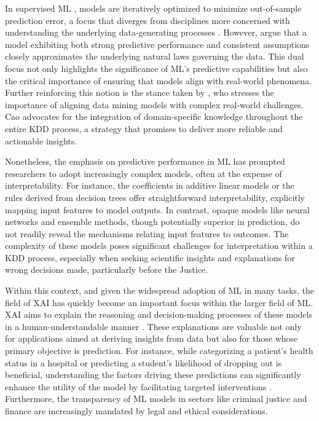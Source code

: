 In supervised ML \cite{Vapnik1999AnTheory}, models are iteratively optimized to minimize out-of-sample prediction error, a focus that diverges from disciplines more concerned with understanding the underlying data-generating processes \cite{Mullainathan2017MachineApproach}. However, \cite{Shmueli2010ToPredict, Zhao2021CausalModels} argue that a model exhibiting both strong predictive performance and consistent assumptions closely approximates the underlying natural laws governing the data. This dual focus not only highlights the significance of ML's predictive capabilities but also the critical importance of ensuring that models align with real-world phenomena. Further reinforcing this notion is the stance taken by \cite{Cao2009IntroductionMining}, who stresses the importance of aligning data mining models with complex real-world challenges. Cao advocates for the integration of domain-specific knowledge throughout the entire \gls{KDD} process, a strategy that promises to deliver more reliable and actionable insights.

Nonetheless, the emphasis on predictive performance in \gls{ML} has prompted researchers to adopt increasingly complex models, often at the expense of interpretability. For instance, the coefficients in additive linear models or the rules derived from decision trees offer straightforward interpretability, explicitly mapping input features to model outputs\cite{molnar2019}. In contrast, opaque models like neural networks and ensemble methods, though potentially superior in prediction, do not readily reveal the mechanisms relating input features to outcomes\cite{Linardatos2021ExplainableMethods}. The complexity of these models poses significant challenges for interpretation within a \gls{KDD} process, especially when seeking scientific insights and explanations for wrong decisions made, particularly before the Justice. 

Within this context, and given the widespread adoption of \gls{ML} in many tasks,  the field of \gls{XAI} has quickly become an important focus within the larger field of \gls{ML}. \gls{XAI} aims to explain the reasoning and decision-making processes of these models in a human-understandable manner \cite{Miller2019ExplanationSciences}. These explanations are valuable not only for applications aimed at deriving insights from data but also for those whose primary objective is prediction. For instance, while categorizing a patient's health status in a hospital or predicting a student's likelihood of dropping out is beneficial, understanding the factors driving these predictions can significantly enhance the utility of the model by facilitating targeted interventions \cite{Razavian2015Population-levelFactors, Pellagatti2021GeneralizedDropout, Berens2019EarlyMethods}.  Furthermore, the transparency of \gls{ML} models in sectors like criminal justice \cite{Wang2023InPrediction} and finance \cite{Bussmann2021ExplainableManagement, Chen2023Globally-ConsistentEvaluation} are increasingly mandated by legal and ethical considerations. 






